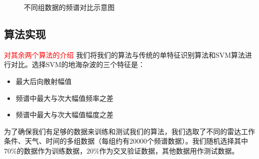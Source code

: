 \begin{figure}[!t]
	\centering
	\hfil
	\centering
	\hfil
	\caption{不同组数据的频谱对比示意图}
	\label{fig:group}
\end{figure}
\subsection{算法实现}
\textcolor{red}{对其余两个算法的介绍}
我们将我们的算法与传统的单特征识别算法和SVM算法进行对比。选择SVM的地海杂波的三个特征是：
\begin{itemize}
	\item 最大后向散射幅值
	\item 频谱中最大与次大幅值频率之差
	\item 频谱中最大与次大幅值幅度之差
\end{itemize}
为了确保我们有足够的数据来训练和测试我们的算法，我们选取了不同的雷达工作条件、天气、时间的多组数据（每组约有20000个频谱数据）。我们随机选择其中$70\%$的数据作为训练数据，$20\%$作为交叉验证数据，其他数据用作测试数据。

